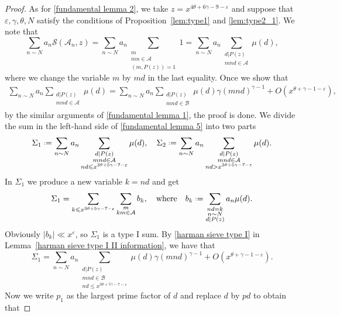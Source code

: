 \documentclass[12pt, reqno, twoside, letterpaper]{amsart}
\numberwithin{equation}{section}
\newcommand{\cA}{\ensuremath{\mathcal{A}}}
\newcommand{\cB}{\ensuremath{\mathcal{B}}}
\newcommand{\cS}{\ensuremath{\mathcal{S}}}
\theoremstyle{customthm}
\theoremstyle{customrem}
\newcommand*{\defeq}{\mathrel{\vcenter{\baselineskip0.5ex \lineskiplimit0pt
			\hbox{\scriptsize.}\hbox{\scriptsize.}}}%
	=}
\begin{document}
\begin{proof}
As for \eqref{fundamental lemma 2}, we take $z = x^{4\theta + 6\gamma - 9 - \varepsilon}$ and suppose that $\varepsilon, \gamma, \theta, N$ satisfy the conditions of Proposition~\ref{lem:type1} and \ref{lem:type2_1}. We note that
$$
\sum_{n \sim N} a_n \cS(\cA_n, z) = \sum_{n \sim N} a_n \sum_{\substack{ m \\ mn\in \cA \\ (m,P(z))=1}}1 =\sum_{n \sim N} a_n \sum_{\substack{ d|P(z) \\ mnd \in \cA}} \mu(d),
$$
where we change the variable $m$ by $md$ in the last equality. Once we show that
\begin{align}\label{fundamental lemma 5}
\sum_{n \sim N} a_n \sum_{\substack{ d|P(z) \\ mnd \in \cA}} \mu(d) = \sum_{n \sim N} a_n \sum_{\substack{ d|P(z) \\ mnd \in \cB}} \mu(d) \gamma (mnd)^{\gamma-1} + O(x^{\theta + \gamma - 1 - \varepsilon}),
\end{align}
by the similar arguments of \eqref{fundamental lemma 1}, the proof is done. We divide the sum in the left-hand side of \eqref{fundamental lemma 5} into two parts
\begin{align*}
\Sigma_1 \defeq \sum_{n \sim N} a_n \sum_{\substack{ d|P(z) \\ mnd \in \cA \\ nd \leqslant x^{3\theta+5\gamma-7-\varepsilon}}} \mu(d), \quad
\Sigma_2 \defeq \sum_{n \sim N} a_n \sum_{\substack{ d|P(z) \\ mnd \in \cA \\ nd > x^{3\theta+5\gamma-7-\varepsilon}}} \mu(d).
\end{align*}
In $\Sigma_1$ we produce a new variable $k = nd$ and get
$$
\Sigma_1 = \sum_{k \leqslant x^{3\theta+5\gamma-7-\varepsilon}} \sum_{\substack{m \\ km \in \cA }} b_k, \quad \text{where} \quad b_k \defeq \sum_{\substack{nd=k \\ n \sim N \\ d|P(z)}}a_n \mu(d).
$$
Obviously $|b_k| \ll x^{\varepsilon}$, so $\Sigma_1$ is a type I sum. By \eqref{harman sieve type I} in Lemma~\ref{harman sieve type I II information}, we have that
$$
\Sigma_1 = \sum_{n \sim N} a_n \sum_{\substack{ d|P(z) \\ mnd \in \cB \\ nd \leqslant x^{3\theta+5\gamma-7-\varepsilon}}} \mu(d) \gamma (mnd)^{\gamma-1} + O(x^{\theta + \gamma - 1 - \varepsilon}).
$$
Now we write $p_1$ as the largest prime factor of $d$ and replace $d$ by $pd$ to obtain that

\end{proof}
\end{document}
